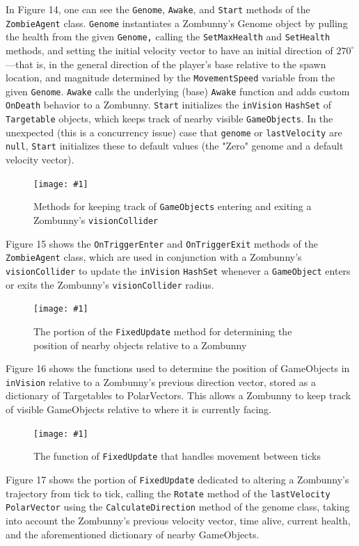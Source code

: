 \documentclass[letterpaper]{article}
\def\imfig#1#2{\begin{figure}[h] \centering \texttt{[image: \#1]} \caption{#2} \end{figure}}
\def\imfigH#1#2{\begin{figure}[H] \centering \texttt{[image: \#1]} \caption{#2} \end{figure}}
\begin{document}
In Figure 14, one can see the \texttt{Genome}, \texttt{Awake}, and \texttt{Start} methods of the
\texttt{ZombieAgent} class. \texttt{Genome} instantiates a Zombunny's Genome object by pulling the
health from the given \texttt{Genome,} calling the \texttt{SetMaxHealth} and \texttt{SetHealth}
methods, and setting the initial velocity vector to have an initial direction of
$270^\circ$\----that is, in the general direction of the player's base relative
to the spawn location, and magnitude determined by the \texttt{MovementSpeed} variable
from the given \texttt{Genome}. \texttt{Awake} calls the underlying (base) \texttt{Awake} function and adds
custom \texttt{OnDeath} behavior to a Zombunny. \texttt{Start} initializes the \texttt{inVision} \texttt{HashSet} of
\texttt{Targetable} objects, which keeps track of nearby visible \texttt{GameObjects}. In the
unexpected (this is a concurrency issue) case that \texttt{genome} or \texttt{lastVelocity} are \texttt{null}, \texttt{Start} initializes these to
default values (the "Zero" genome and a default velocity vector).

\imfigH{ZombieAgentVision}{Methods for keeping track of \texttt{GameObjects} entering
  and exiting a Zombunny's \texttt{visionCollider}}

Figure 15 shows the \texttt{OnTriggerEnter} and \texttt{OnTriggerExit} methods of the \texttt{ZombieAgent}
class, which are used in conjunction with a Zombunny's \texttt{visionCollider} to update
the \texttt{inVision} \texttt{HashSet} whenever a \texttt{GameObject} enters or exits the Zombunny's
\texttt{visionCollider} radius.

\imfigH{ZombieAgentUpdateNearby}{The portion of the \texttt{FixedUpdate} method for
determining the position of nearby objects relative to a Zombunny}

Figure 16 shows the functions used to determine the position of GameObjects in
\texttt{inVision} relative to a Zombunny's previous direction vector, stored as a
dictionary of Targetables to PolarVectors. This allows a Zombunny to keep track
of visible GameObjects relative to where it is currently facing.

\imfig{ZombieAgentUpdateMovement}{The function of \texttt{FixedUpdate} that handles
  movement between ticks}

Figure 17 shows the portion of \texttt{FixedUpdate} dedicated to altering a Zombunny's
trajectory from tick to tick, calling the \texttt{Rotate} method of the \texttt{lastVelocity}
\texttt{PolarVector} using the \texttt{CalculateDirection} method of the genome class, taking into
account the Zombunny's previous velocity vector, time alive, current health, and
the aforementioned dictionary of nearby GameObjects.
\end{document}
